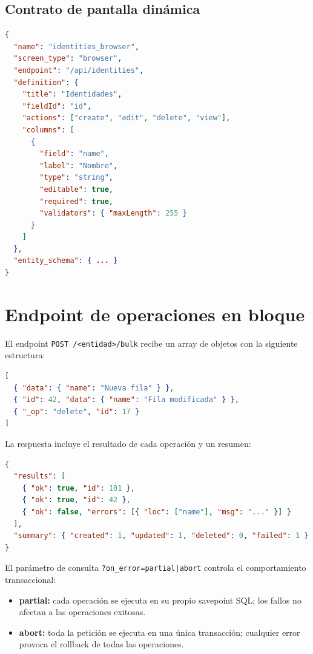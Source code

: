 \subsection{Contrato de pantalla dinámica}
\label{subsec:contrato-pantalla}

\begin{lstlisting}[language=json, caption={Ejemplo de objeto de pantalla dinámica (screen definition).}]
{
  "name": "identities_browser",
  "screen_type": "browser",
  "endpoint": "/api/identities",
  "definition": {
    "title": "Identidades",
    "fieldId": "id",
    "actions": ["create", "edit", "delete", "view"],
    "columns": [
      {
        "field": "name",
        "label": "Nombre",
        "type": "string",
        "editable": true,
        "required": true,
        "validators": { "maxLength": 255 }
      }
    ]
  },
  "entity_schema": { ... }
}
\end{lstlisting}

\section{Endpoint de operaciones en bloque}
\label{sec:bulk-endpoint}

El endpoint \texttt{POST /<entidad>/bulk} recibe un array de objetos con la siguiente
estructura:

\begin{lstlisting}[language=json, caption={Payload del endpoint /bulk.}]
[
  { "data": { "name": "Nueva fila" } },
  { "id": 42, "data": { "name": "Fila modificada" } },
  { "_op": "delete", "id": 17 }
]
\end{lstlisting}

La respuesta incluye el resultado de cada operación y un resumen:

\begin{lstlisting}[language=json, caption={Respuesta del endpoint /bulk.}]
{
  "results": [
    { "ok": true, "id": 101 },
    { "ok": true, "id": 42 },
    { "ok": false, "errors": [{ "loc": ["name"], "msg": "..." }] }
  ],
  "summary": { "created": 1, "updated": 1, "deleted": 0, "failed": 1 }
}
\end{lstlisting}

El parámetro de consulta \texttt{?on\_error=partial|abort} controla el comportamiento
transaccional:

\begin{itemize}
  \item \textbf{partial:} cada operación se ejecuta en su propio savepoint SQL; los fallos
    no afectan a las operaciones exitosas.
  \item \textbf{abort:} toda la petición se ejecuta en una única transacción; cualquier
    error provoca el rollback de todas las operaciones.
\end{itemize}

